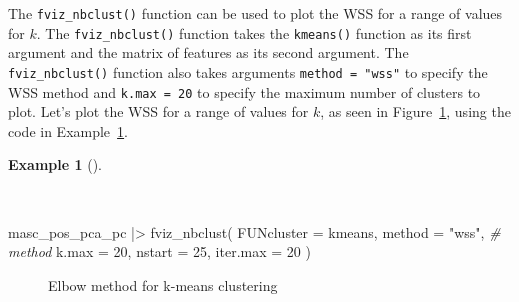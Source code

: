 \documentclass[
  letterpaper,
  krantz1]{latex/krantz-mod}
\newenvironment{Shaded}{\begin{snugshade}}{\end{snugshade}}
\newcommand{\AttributeTok}[1]{\textcolor[rgb]{0.00,0.00,0.00}{#1}}
\newcommand{\CommentTok}[1]{\textcolor[rgb]{0.00,0.00,0.00}{\textit{#1}}}
\newcommand{\DecValTok}[1]{\textcolor[rgb]{0.00,0.00,0.00}{#1}}
\newcommand{\FunctionTok}[1]{\textcolor[rgb]{0.00,0.00,0.00}{#1}}
\newcommand{\NormalTok}[1]{\textcolor[rgb]{0.00,0.00,0.00}{#1}}
\newcommand{\SpecialCharTok}[1]{\textcolor[rgb]{0.00,0.00,0.00}{#1}}
\newcommand{\StringTok}[1]{\textcolor[rgb]{0.00,0.00,0.00}{#1}}
\theoremstyle{definition}
\theoremstyle{definition}
\newtheorem{example}{Example}[chapter]
\theoremstyle{remark}
\begin{document}
The \texttt{fviz\_nbclust()} function can be used to plot the WSS for a
range of values for \(k\). The \texttt{fviz\_nbclust()} function takes
the \texttt{kmeans()} function as its first argument and the matrix of
features as its second argument. The \texttt{fviz\_nbclust()} function
also takes arguments \texttt{method\ =\ "wss"} to specify the WSS method
and \texttt{k.max\ =\ 20} to specify the maximum number of clusters to
plot. Let's plot the WSS for a range of values for \(k\), as seen in
Figure~\ref{fig-explore-masc-pos-kmeans-elbow}, using the code in
Example~\ref{exm-explore-masc-pos-kmeans-elbow}.

\pagebreak

\begin{example}[]\protect\hypertarget{exm-explore-masc-pos-kmeans-elbow}{}\label{exm-explore-masc-pos-kmeans-elbow}

~

\begin{Shaded}
\begin{Highlighting}[numbers=left,,]
\NormalTok{masc\_pos\_pca\_pc }\SpecialCharTok{|\textgreater{}}
  \FunctionTok{fviz\_nbclust}\NormalTok{(}
    \AttributeTok{FUNcluster =}\NormalTok{ kmeans,}
    \AttributeTok{method =} \StringTok{"wss"}\NormalTok{, }\CommentTok{\# method}
    \AttributeTok{k.max =} \DecValTok{20}\NormalTok{,}
    \AttributeTok{nstart =} \DecValTok{25}\NormalTok{,}
    \AttributeTok{iter.max =} \DecValTok{20}
\NormalTok{  )}
\end{Highlighting}
\end{Shaded}

\end{example}

\begin{figure}[!htb]


\caption{\label{fig-explore-masc-pos-kmeans-elbow}Elbow method for
k-means clustering}

\end{figure}%
\end{document}
